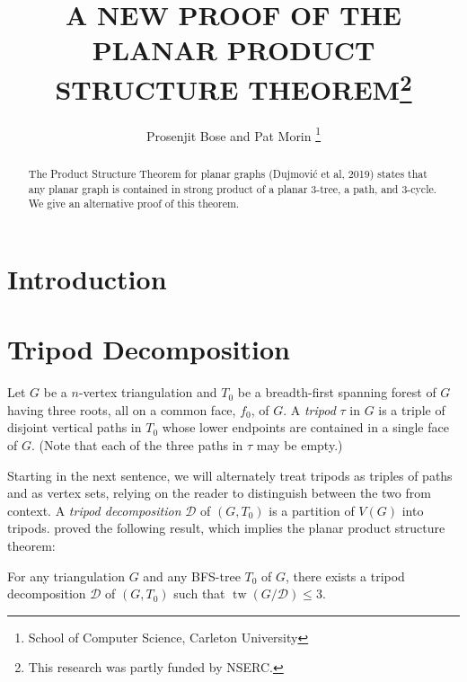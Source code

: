 \documentclass{patmorin}
\title{\MakeUppercase{A New Proof of the Planar Product Structure Theorem}\thanks{This research was partly funded by NSERC.}}
\author{Prosenjit Bose and Pat Morin%
    \thanks{School of Computer Science, Carleton University}}
\date{}
\DeclareMathOperator{\tw}{tw}
\begin{document}
\maketitle

\begin{abstract}
    The Product Structure Theorem for planar graphs (Dujmović et al, 2019) states that any planar graph is contained in strong product of a planar $3$-tree, a path, and $3$-cycle.  We give an alternative proof of this theorem.
\end{abstract}

%

\section{Introduction}

\section{Tripod Decomposition}


Let $G$ be a $n$-vertex triangulation and $T_0$ be a breadth-first spanning forest of $G$ having three roots, all on a common face, $f_0$, of $G$.  A \emph{tripod} $\tau$ in $G$ is a triple of disjoint vertical paths in $T_0$ whose lower endpoints are contained in a single face of $G$.  (Note that each of the three paths in $\tau$ may be empty.)

Starting in the next sentence, we will alternately treat tripods as triples of paths and as vertex sets, relying on the reader to distinguish between the two from context.  A \emph{tripod decomposition} $\mathcal{D}$ of $(G,T_0)$ is a partition of $V(G)$ into tripods.  \citet{dujmovic.joret.ea:planar} proved the following result, which implies the planar product structure theorem:

\begin{thm}\label{tripod_decomposition}
  For any triangulation $G$ and any BFS-tree $T_0$ of $G$, there exists a tripod decomposition $\mathcal{D}$ of $(G,T_0)$ such that $\tw(G/\mathcal{D})\le 3$.
\end{thm}
\end{document}
